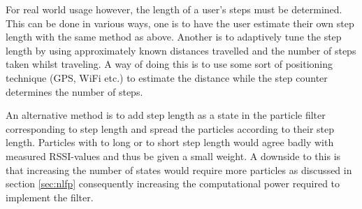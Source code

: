 \documentclass{LTHthesis}
\begin{document}
For real world usage however, the length of a user's steps must be determined. This can be done in various ways, one is to have the user estimate their own step length with the same method as above. Another is to adaptively tune the step length by using approximately known distances travelled and the number of steps taken whilst traveling. A way of doing this is to use some sort of positioning technique (GPS, WiFi etc.) to estimate the distance while the step counter determines the number of steps.

An alternative method is to add step length as a state in the particle filter corresponding to step length and spread the particles according to their step length. Particles with to long or to short step length would agree badly with measured RSSI-values and thus be given a small weight. A downside to this is that increasing the number of states would require more particles as discussed in section \ref{sec:nlfp} consequently increasing the computational power required to implement the filter.      
%
\end{document}
